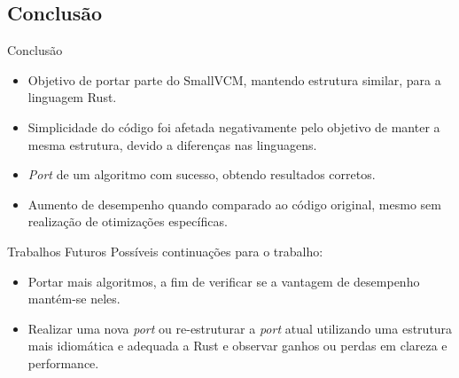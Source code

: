 \documentclass{beamer}
\begin{document}
\subsection{Conclusão}
\begin{frame}{Conclusão}
	\begin{itemize}
		\item Objetivo de portar parte do SmallVCM, mantendo estrutura similar, para a linguagem Rust.
		\item Simplicidade do código foi afetada negativamente pelo objetivo de manter a mesma estrutura, devido a diferenças nas linguagens.
		\item \emph{Port} de um algoritmo com sucesso, obtendo resultados corretos.
		\item Aumento de desempenho quando comparado ao código original, mesmo sem realização de otimizações específicas.
	\end{itemize}
\end{frame}

\begin{frame}{Trabalhos Futuros}
		Possíveis continuações para o trabalho:
		\begin{itemize}
			\item Portar mais algoritmos, a fim de verificar se a vantagem de desempenho mantém-se neles.
			\item Realizar uma nova \emph{port} ou re-estruturar a \emph{port} atual utilizando uma estrutura mais idiomática e adequada a Rust e observar ganhos ou perdas em clareza e performance.
		\end{itemize}
\end{frame}

\begin{frame}
\titlepage
\end{frame}
\end{document}
